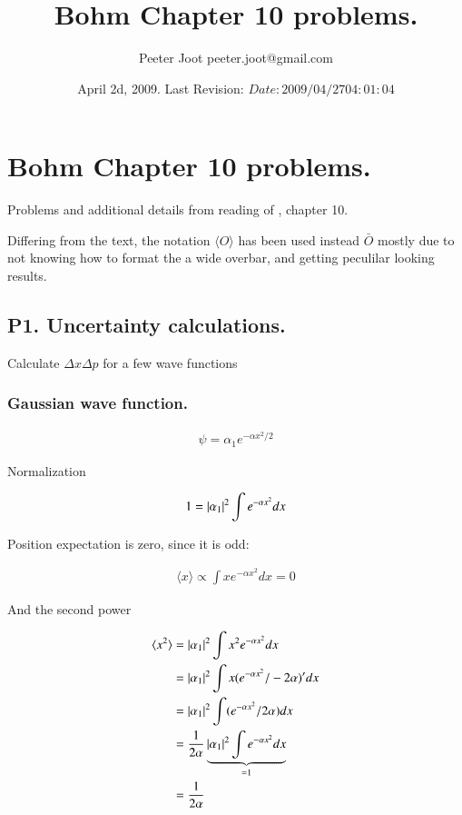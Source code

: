 \documentclass{article}
\title{ Bohm Chapter 10 problems. }
\author{Peeter Joot \quad peeter.joot@gmail.com }
\date{ April 2d, 2009.  Last Revision: $Date: 2009/04/27 04:01:04 $ }
\newcommand{\expectation}[1]{\langle{#1}\rangle}
\begin{document}
\maketitle{}
\tableofcontents
\section{ Bohm Chapter 10 problems. }

Problems and additional details from reading of \cite{bohm1989qt}, chapter 10.

Differing from the text, the notation $\expectation{O}$ has been used instead $\bar{O}$ mostly due to not knowing how to format the a wide overbar, and getting peculilar looking results.

\subsection{ P1. Uncertainty calculations. }

Calculate $\Delta x \Delta p$ for a few wave functions

\subsubsection{ Gaussian wave function. }

\begin{align*}
\psi = \alpha_1 e^{-\alpha x^2/2}
\end{align*}

Normalization

\begin{align*}
1 
&= \left\lvert{\alpha_1}\right\rvert^2 \int e^{-\alpha x^2} dx \\
\end{align*}

Position expectation is zero, since it is odd:

\begin{align*}
\expectation{x} \propto \int x e^{-\alpha x^2} dx = 0
\end{align*}

And the second power

\begin{align*}
\expectation{x^2} 
&= \Abs{\alpha_1}^2 \int x^2 e^{-\alpha x^2} dx \\
&= \Abs{\alpha_1}^2 \int x (e^{-\alpha x^2}/-2\alpha)' dx \\
&= \Abs{\alpha_1}^2 \int (e^{-\alpha x^2}/2\alpha) dx \\
&= \inv{2\alpha} \underbrace{\Abs{\alpha_1}^2 \int e^{-\alpha x^2} dx}_{=1} \\
&= \inv{2\alpha}
\end{align*}
\end{document}
